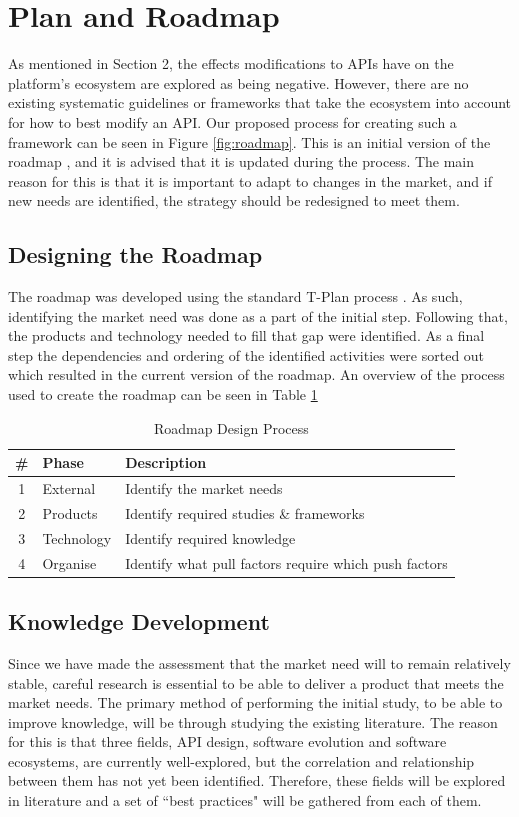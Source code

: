 \documentclass{article}
\begin{document}
\section{Plan and Roadmap}
As mentioned in Section 2, the effects modifications to APIs have on the platform’s ecosystem are explored as being negative. However, there are no existing systematic guidelines or frameworks that take the ecosystem into account for how to best modify an API. Our proposed process for creating such a framework can be seen in Figure \ref{fig:roadmap}. This is an initial version of the roadmap \cite{phaal2004technology}, and it is advised that it is updated during the process. The main reason for this is that it is important to adapt to changes in the market, and if new needs are identified, the strategy should be redesigned to meet them. 

\subsection{Designing the Roadmap}
The roadmap was developed using the standard T-Plan process \cite{phaal2004technology}. As such, identifying the market need was done as a part of the initial step. Following that, the products and technology needed to fill that gap were identified. As a final step the dependencies and ordering of the identified activities were sorted out which resulted in the current version of the roadmap. An overview of the process used to create the roadmap can be seen in Table \ref{tab:proc}

\begin{table}[ht]
\centering
\begin{tabular}[ht]{|c|l|l|}
\hline
\textbf{\#} & \textbf{Phase} & \textbf{Description} \\
\hline
1 & External & Identify the market needs \\
\hline
2 & Products & Identify required studies \& frameworks \\
\hline
3 & Technology & Identify required knowledge \\
\hline
4 & Organise & Identify what pull factors require which push factors \\
\hline
\end{tabular}
\caption{Roadmap Design Process}
\label{tab:proc}
\end{table}

\subsection{Knowledge Development}
Since we have made the assessment that the market need will to remain relatively stable, careful research is essential to be able to deliver a product that meets the market needs. The primary method of performing the initial study, to be able to improve knowledge, will be through studying the existing literature. The reason for this is that three fields, API design, software evolution and software ecosystems, are currently well-explored, but the correlation and relationship between them has not yet been identified. Therefore, these fields will be explored in literature and a set of ``best practices" will be gathered from each of them. 
\end{document}
